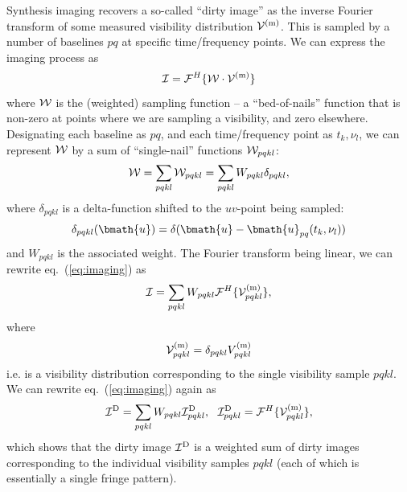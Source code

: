 \documentclass[useAMS,usenatbib]{mn2e}
\begin{document}
Synthesis imaging recovers a so-called ``dirty image'' as the inverse Fourier transform of some measured  
visibility distribution $\mathcal{V}^\mathrm{(m)}$. This is sampled by a number of baselines $pq$ at specific time/frequency points.
We can express the imaging process as
\begin{equation}
\label{eq:imaging}
\mathcal{I} = \mathcal{F}^H\{ \mathcal{W}\cdot \mathcal{V}^\mathrm{(m)} \}  
\end{equation}
where $\mathcal{W}$ is the (weighted) sampling function -- a ``bed-of-nails'' function that is non-zero at points where we 
are sampling a visibility, and zero elsewhere. Designating each baseline as $pq$, and each time/frequency point
as $t_k,\nu_l$, we can represent $\mathcal{W}$ by a sum of  ``single-nail'' functions $\mathcal{W}_{pqkl}$:
\begin{equation}
\mathcal{W} = \sum_{pqkl} \mathcal{W}_{pqkl} = \sum_{pqkl} W_{pqkl} \delta_{pqkl},
\end{equation}
where $\delta_{pqkl}$ is a delta-function shifted to the $uv$-point being sampled:
\begin{equation}
\delta_{pqkl}(\bmath{u}) = \delta(\bmath{u}-\bmath{u}_{pq}(t_k,\nu_l))
\end{equation}
and $W_{pqkl}$ is the 
associated weight. The Fourier transform being linear, we can rewrite eq.~(\ref{eq:imaging}) as 
\begin{equation}
\label{eq:imaging2}
\mathcal{I} = \sum_{pqkl} W_{pqkl} \mathcal{F}^H\{ \mathcal{V}^\mathrm{(m)}_{pqkl} \},
\end{equation}
where 
\begin{equation}
\label{eq:imaging2a}
\mathcal{V}^\mathrm{(m)}_{pqkl} = \delta_{pqkl} V^\mathrm{(m)}_{pqkl}
\end{equation}
i.e. is a visibility distribution corresponding to the single visibility sample $pqkl$. We can rewrite eq.~(\ref{eq:imaging})
again as
\begin{equation}
\label{eq:imaging3}
\mathcal{I}^\mathrm{D} =  \sum_{pqkl} W_{pqkl} \mathcal{I}^\mathrm{D}_{pqkl},~~
\mathcal{I}^\mathrm{D}_{pqkl} =  \mathcal{F}^H\{ \mathcal{V}^\mathrm{(m)}_{pqkl} \},
\end{equation}
which shows that the dirty image $\mathcal{I}^\mathrm{D}$ is a weighted sum of dirty images corresponding to the individual visibility 
samples $pqkl$ (each of which is essentially a single fringe pattern).
\end{document}
